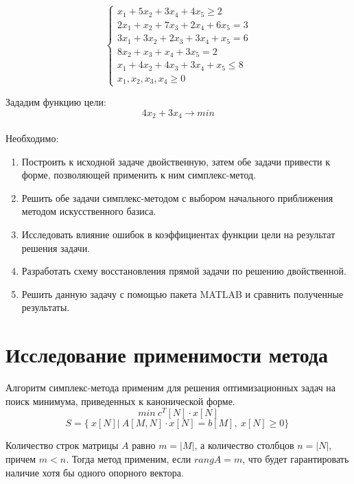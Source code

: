 \documentclass{article}
\begin{document}
\begin{equation*}
 \begin{cases}
  x_1+5x_2+3x_4+4x_5 \ge 2 
   \\
   2x_1+x_2+7x_3+2x_4+6x_5 = 3
   \\
   3x_1+3x_2+2x_3+3x_4+x_5 = 6
   \\
   8x_2+x_3+x_4+3x_5 = 2
   \\
   x_1+4x_2+4x_3+3x_4+x_5 \le 8
   \\
   x_1, x_2, x_3, x_4 \ge 0
 \end{cases}
\end{equation*}

\noindent Зададим функцию цели: $$4x_2+3x_4 \rightarrow min$$
\\
\noindent Необходимо:
\begin{enumerate} 
\item Построить к исходной задаче двойственную, затем обе задачи привести к форме, позволяющей применить к ним симплекс-метод.
\item Решить обе задачи симплекс-методом с выбором начального приближения методом искусственного базиса.
\item Исследовать влияние ошибок в коэффициентах функции цели на результат решения задачи.
\item Разработать схему восстановления прямой задачи по решению двойственной.
\item Решить данную задачу с помощью пакета MATLAB и сравнить полученные результаты.
\end{enumerate}

\section{Исследование применимости метода}
\noindent Алгоритм симплекс-метода применим для решения оптимизационных задач на поиск минимума, приведенных к канонической форме.  
\begin{equation*}
  min~c^T[N] \cdot x[N]  
\end{equation*}
\begin{equation}
S = \{\ x[N]|~ A[M, N] \cdot x[N] = b[M],~x[N] \ge 0 \}\
\label{one} 
\end{equation}

\noindent Количество строк матрицы $A$ равно $m = |M|$, а количество столбцов $n = |N|$, причем $m < n$. 
Тогда метод применим, если $rangA = m$, что будет гарантировать наличие хотя бы одного опорного вектора.\\
\end{document}
